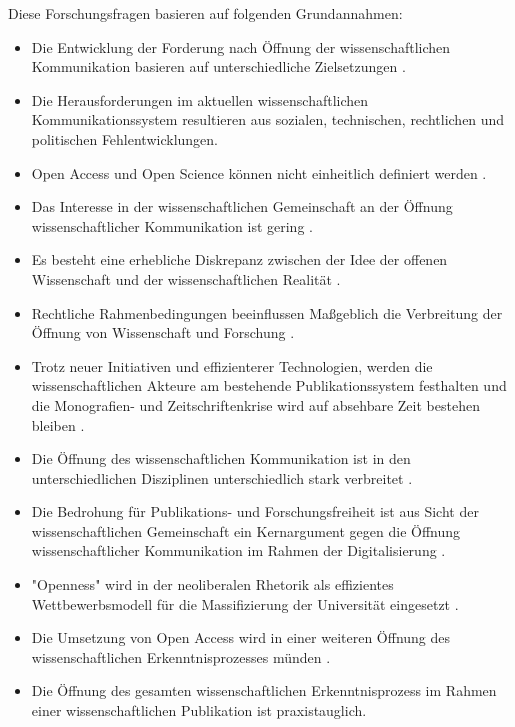 Diese Forschungsfragen basieren auf folgenden Grundannahmen:
\begin{itemize}
\item Die Entwicklung der Forderung nach Öffnung der wissenschaftlichen Kommunikation basieren auf unterschiedliche Zielsetzungen \cite{suchen-Hoffmann-Zugang-undVerwertung-oeffentlicher-Informationen}.
\item Die Herausforderungen im aktuellen wissenschaftlichen Kommunikationssystem resultieren aus sozialen, technischen, rechtlichen und politischen Fehlentwicklungen.
\item Open Access und Open Science können nicht einheitlich definiert werden \cite{naeder_2010_open}.
\item Das Interesse in der wissenschaftlichen Gemeinschaft an der Öffnung wissenschaftlicher Kommunikation ist gering \cite{hagner_2015_sache_buches}.
\item Es besteht eine erhebliche Diskrepanz zwischen der Idee der offenen Wissenschaft und der wissenschaftlichen Realität \cite{Scheliga_2014}.
\item Rechtliche Rahmenbedingungen beeinflussen Maßgeblich die Verbreitung der Öffnung von Wissenschaft und Forschung \cite[:211]{Fehling_2014}.
\item Trotz neuer Initiativen und effizienterer Technologien, werden die wissenschaftlichen Akteure am bestehende Publikationssystem festhalten und die Monografien- und Zeitschriftenkrise wird auf absehbare Zeit bestehen bleiben \cite{Parks_2002_acadamic_faust} \cite{Goetting_2015}.
\item Die Öffnung des wissenschaftlichen Kommunikation ist in den unterschiedlichen Disziplinen unterschiedlich stark verbreitet \cite{EuropeanCommission_sciencepub_2006}.
\item Die Bedrohung für Publikations- und Forschungsfreiheit ist aus Sicht der wissenschaftlichen Gemeinschaft ein Kernargument gegen die Öffnung wissenschaftlicher Kommunikation im Rahmen der Digitalisierung \cite{siehe_unten}.
\item "Openness" wird in der neoliberalen Rhetorik als effizientes Wettbewerbsmodell für die Massifizierung der Universität eingesetzt \cite{tkacz_2012_open}.
\item Die Umsetzung von Open Access wird in einer weiteren Öffnung des wissenschaftlichen Erkenntnisprozesses münden \cite{siehe_unten}.
\item Die Öffnung des gesamten wissenschaftlichen Erkenntnisprozess im Rahmen einer wissenschaftlichen Publikation ist praxistauglich.
\end{itemize}

